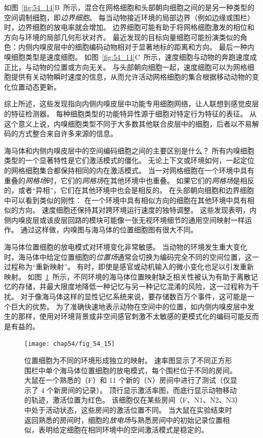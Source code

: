 如图~\ref{fig:54_14}B~所示，混合在网格细胞和头部朝向细胞之间的是另一种类型的空间调制细胞，即\textit{边界细胞}。
每当动物接近环境的局部边界（例如边缘或围栏）时，边界细胞的放电率就会增加。
边界细胞可能有助于将网格细胞激发的相位和方向与环境的局部几何形状对齐。
最近发现的目标向量细胞可能扮演类似的角色：内侧内嗅皮层中的细胞编码动物相对于显著地标的距离和方向。
最后一种内嗅细胞类型是速度细胞。
如图~\ref{fig:54_14}C~所示，速度细胞与动物的奔跑速度成正比，与动物的位置或方向无关。
与头部朝向细胞一起，速度细胞可以为网格细胞提供有关动物瞬时速度的信息，从而允许活动网格细胞的集合根据移动动物的变化位置动态更新。


综上所述，这些发现指向内侧内嗅皮层中功能专用细胞网络，让人联想到感觉皮层的特征检测器。
每种细胞类型的功能特异性源于细胞对特定行为特征的表征。
从这个意义上说，内嗅细胞类型不同于大多数其他联合皮层中的细胞，后者以不易解码的方式整合来自许多来源的信息。


海马体和内侧内嗅皮层中的空间编码细胞之间的主要区别是什么？
所有内嗅细胞类型的一个显著特性是它们激活模式的僵化。
无论上下文或环境如何，一起定位的网格细胞集合都保持相同的内在激活模式。
当一对网格细胞在一个环境中具有重叠的\textit{网格场}时，它们的\textit{网格场}在其他环境中也重叠。
如果它们的\textit{网格场}是相反的，或者“异相”，它们在其他环境中也会是相反的。
在头部朝向细胞和边界细胞中可以看到类似的刚性：
在一个环境中具有相似方向的细胞在其他环境中具有相似的方向。
速度细胞还保持其对跨环境运行速度的独特调整。
这些发现表明，内侧内嗅皮层或该皮层回路的模块可能像一张无视环境细节的通用空间映射一样运作。
通过这样做，内嗅图与海马体的位置细胞图有很大不同。


海马体位置细胞的放电模式对环境变化非常敏感。
当动物的环境发生重大变化时，海马体中给定位置细胞的\textit{位置场}通常会切换为编码完全不同的空间位置，这一过程称为“重新映射”。
有时，即使是感官或动机输入的微小变化也足以引发重新映射。
如图~\ref{fig:54_15}~所示，不同环境的海马体位置映射缺乏相关性被认为有助于离散记忆的存储，并最大限度地降低一种记忆与另一种记忆混淆的风险，这一过程称为干扰。
对于像海马体这样的显性记忆系统来说，要存储数百万个事件，这可能是一个巨大的优势。
为了准确快速地表示动物在空间中的位置，如内侧内嗅皮层中发生的那样，使用对环境背景或非空间感官刺激不太敏感的更模式化的编码可能反而是有益的。


\begin{figure}[htbp]
	\centering
	\texttt{[image: chap54/fig\_54\_15]}
	\caption{位置细胞为不同的环境形成独立的映射。
		速率图显示了不同正方形围栏中单个海马体位置细胞的放电模式，每个围栏位于不同的房间。
		大鼠在一个熟悉的（F）和 11 个新的（N）房间中进行了测试（仅显示了 4 个新房间的记录）。
		顶行显示激活率图，而底行显示动物移动的轨迹，激活位置为红色。
		该细胞仅在某些房间（F、N1、N2、N3）中处于活动状态，这些房间的激活位置不同。
		当大鼠在实验结束时返回熟悉的房间时，细胞的\textit{放电场}与熟悉房间中的初始记录位置相似，表明给定细胞在相同环境中的空间激活模式是稳定的\cite{alme2014place}。}
	\label{fig:54_15}
\end{figure}



